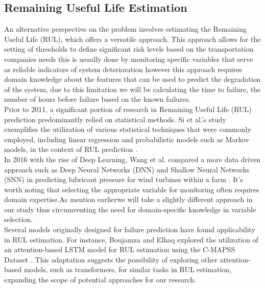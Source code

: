 \documentclass{article}
\begin{document}
\subsection*{Remaining Useful Life Estimation}

An alternative perspective on the problem involves estimating the Remaining Useful Life (RUL), which offers a versatile approach. This approach allows for the setting of thresholds to define significant risk levels based on the transportation companies needs this is usually done by monitoring specific variables that serve as reliable indicators of system deterioration however this approach requires domain knowledge about the features that can be used to predict the degradation of the system, due to this limitation we will be calculating the time to failure, the number of hours before failure based on the known failures. \\

Prior to 2011, a significant portion of research in Remaining Useful Life (RUL) prediction predominantly relied on statistical methods. Si et al.'s study exemplifies the utilization of various statistical techniques that were commonly employed, including linear regression and probabilistic models such as Markov models, in the context of RUL prediction \cite{SI2011}. \\

In 2016 with the rise of Deep Learning, Wang et al. compared a more data driven approach such as Deep Neural Networks (DNN) and Shallow Neural Networks (SNN) in predicting lubricant pressure for wind turbines within a farm \cite{wang2016}. It's worth noting that selecting the appropriate variable for monitoring often requires domain expertise.As mention earlierwe will take a slightly different approach in our study thus circumventing the need for domain-specific knowledge in variable selection. \\

Several models originally designed for failure prediction have found applicability in RUL estimation. For instance, Boujamza and Elhaq explored the utilization of an attention-based LSTM model for RUL estimation using the C-MAPSS Dataset \cite{Boujamza2022}. This adaptation suggests the possibility of exploring other attention-based models, such as transformers, for similar tasks in RUL estimation, expanding the scope of potential approaches for our research.

\newpage



\end{document}
